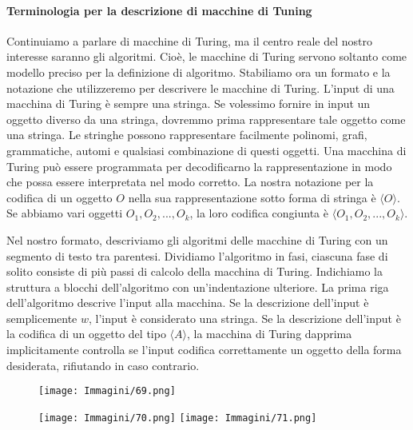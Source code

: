 \documentclass{article}
\begin{document}
\paragraph{Terminologia per la descrizione di macchine di Tuning}
\label{def:terminology_turing_machine}
\text{ }

Continuiamo a parlare di macchine di Turing, ma il centro reale del nostro interesse saranno gli algoritmi. 
Cioè, le macchine di Turing servono soltanto come modello preciso per la definizione di algoritmo. 
Stabiliamo ora un formato e la notazione che utilizzeremo per descrivere le macchine di Turing. 
L'input di una macchina di Turing è sempre una stringa. 
Se volessimo fornire in input un oggetto diverso da una stringa, dovremmo prima rappresentare tale oggetto come una stringa.
Le stringhe possono rappresentare facilmente polinomi, grafi, grammatiche, automi e qualsiasi combinazione di questi oggetti.
Una macchina di Turing può essere programmata per decodificarno la rappresentazione in modo che possa essere interpretata nel modo corretto.
La nostra notazione per la codifica di un oggetto $O$ nella sua rappresentazione sotto forma di stringa è $\langle O \rangle$.
Se abbiamo vari oggetti $O_1,O_2,...,O_k$, la loro codifica congiunta è $\langle O_1,O_2,...,O_k \rangle$.

Nel nostro formato, descriviamo gli algoritmi delle macchine di Turing con un segmento di testo tra parentesi. 
Dividiamo l'algoritmo in fasi, ciascuna fase di solito consiste di più passi di calcolo della macchina di Turing.
Indichiamo la struttura a blocchi dell'algoritmo con un'indentazione ulteriore. 
La prima riga dell'algoritmo descrive l'input alla macchina. 
Se la descrizione dell'input è semplicemente $w$, l'input è considerato una stringa. 
Se la descrizione dell'input è la codifica di un oggetto del tipo $\langle A \rangle$, la macchina di Turing dapprima implicitamente controlla se l'input codifica correttamente un oggetto della forma desiderata, rifiutando in caso contrario.

\begin{figure}[H]
    \centering
    \texttt{[image: Immagini/69.png]}
    \label{fig:example_image1}
\end{figure}

\begin{figure}[H]
    \centering
    \texttt{[image: Immagini/70.png]}
    \texttt{[image: Immagini/71.png]}
    \label{fig:example_image2}
\end{figure}
\newpage
\end{document}
